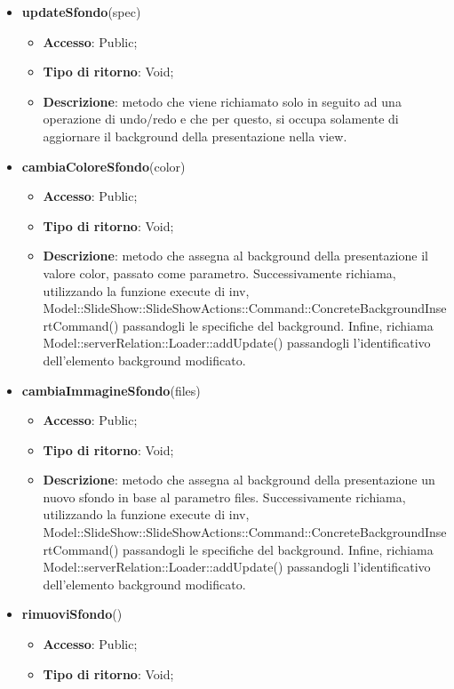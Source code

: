 {{\begin{itemize}
\begin{itemize}
		\end{itemize}
		\item \textbf{updateSfondo}(spec)
		\begin{itemize}
			\item \textbf{Accesso}: Public;
			\item \textbf{Tipo di ritorno}: Void;
			\item \textbf{Descrizione}: metodo che viene richiamato solo in seguito ad una operazione di undo/redo e che per questo, si occupa solamente di aggiornare il background della presentazione nella view.
		\end{itemize}
		\item \textbf{cambiaColoreSfondo}(color)
		\begin{itemize}
			\item \textbf{Accesso}: Public;
			\item \textbf{Tipo di ritorno}: Void;
			\item \textbf{Descrizione}: metodo che assegna al background della presentazione il valore color, passato come parametro. Successivamente richiama, utilizzando la funzione execute di inv, Model::\-SlideShow::\-SlideShowActions::\-Command::\-ConcreteBackgroundInsertCommand() passandogli le specifiche del background. Infine, richiama Model::\-serverRelation::\-Loader::\-addUpdate() passandogli l'identificativo dell'elemento background modificato.
		\end{itemize}
		\item \textbf{cambiaImmagineSfondo}(files)
		\begin{itemize}
			\item \textbf{Accesso}: Public;
			\item \textbf{Tipo di ritorno}: Void;
			\item \textbf{Descrizione}: metodo che assegna al background della presentazione un nuovo sfondo in base al parametro files. Successivamente richiama, utilizzando la funzione execute di inv, Model::\-SlideShow::\-SlideShowActions::\-Command::\-ConcreteBackgroundInsertCommand() passandogli le specifiche del background. Infine, richiama Model::\-serverRelation::\-Loader::\-addUpdate() passandogli l'identificativo dell'elemento background modificato.
		\end{itemize}
		\item \textbf{rimuoviSfondo}()
		\begin{itemize}
			\item \textbf{Accesso}: Public;
			\item \textbf{Tipo di ritorno}: Void;

\end{itemize}
\end{itemize}}}
